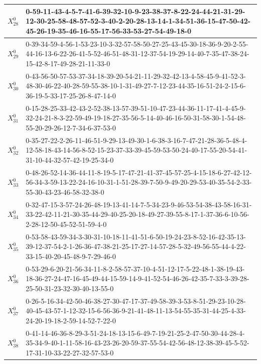 \begin{landscape}
{\begin{tabularx}{\linewidth}{|c|X|}
        $X_{28}^{0}$ & 0-59-11-43-4-5-7-41-6-39-32-10-9-23-38-37-8-22-24-44-21-31-29-12-30-25-58-48-57-52-3-40-2-20-28-13-14-1-34-51-36-15-47-50-42-45-26-19-35-46-16-55-17-56-33-53-27-54-49-18-0 \\ \hline
        $X_{29}^{0}$ & 0-39-34-59-4-56-1-53-23-10-3-32-57-58-50-27-25-43-45-30-18-36-9-20-2-55-44-16-13-6-22-26-41-5-52-46-51-48-31-12-37-54-19-29-14-40-7-35-47-38-24-15-42-8-17-49-28-21-11-33-0 \\ \hline
        $X_{30}^{0}$ & 0-43-56-50-57-53-37-34-18-39-20-54-21-11-29-32-42-13-4-58-45-9-41-52-3-48-30-46-22-40-28-59-55-38-10-1-31-49-27-7-12-23-44-35-16-51-24-2-15-6-36-19-5-33-17-25-26-8-47-14-0 \\ \hline
        $X_{31}^{0}$ & 0-15-28-25-33-42-43-2-52-38-13-57-39-51-10-47-23-44-36-11-17-41-4-45-9-32-24-21-8-3-22-59-49-19-18-27-35-56-5-14-40-46-16-50-31-58-30-1-54-48-55-20-29-26-12-7-34-6-37-53-0 \\ \hline
        $X_{32}^{0}$ & 0-35-27-22-2-26-11-46-51-9-29-13-49-30-1-6-38-3-16-7-47-21-28-36-5-48-4-12-58-18-43-14-56-8-52-15-23-37-33-39-45-59-53-50-24-40-17-55-20-54-41-31-10-44-32-57-42-19-25-34-0 \\ \hline
        $X_{33}^{0}$ & 0-48-26-52-14-36-44-11-8-19-5-17-47-21-41-37-45-57-25-4-15-18-6-27-42-12-56-34-3-59-13-22-24-16-10-31-1-51-28-39-7-50-9-49-20-29-53-40-35-54-2-33-55-30-43-23-46-58-32-38-0 \\ \hline
        $X_{34}^{0}$ & 0-32-47-15-3-57-24-26-48-19-13-41-14-7-5-34-23-9-46-53-54-38-43-58-16-31-33-22-42-11-21-30-35-44-29-40-25-20-18-49-27-39-55-8-17-1-37-36-6-10-56-2-28-12-50-45-52-51-59-4-0 \\ \hline
        $X_{35}^{0}$ & 0-53-58-43-59-34-3-30-31-10-18-11-41-51-6-50-19-24-23-8-52-16-42-35-13-39-12-37-54-2-1-26-36-47-38-21-25-17-27-14-57-28-5-32-49-56-55-44-4-22-33-15-40-20-45-48-9-7-29-46-0 \\ \hline
        $X_{36}^{0}$ & 0-53-29-6-20-21-56-34-11-8-2-58-57-37-10-4-51-12-17-5-22-48-1-38-19-43-18-36-27-24-47-16-45-49-44-15-59-14-9-41-52-54-46-26-42-35-7-33-3-39-28-25-50-31-23-32-30-40-13-55-0 \\ \hline
        $X_{37}^{0}$ & 0-26-5-16-34-42-50-46-38-27-30-47-17-37-49-58-39-3-53-8-51-29-23-10-28-40-45-43-57-1-12-32-15-6-56-36-9-21-41-48-11-13-54-55-35-31-44-25-4-33-24-20-19-18-2-59-14-52-7-22-0 \\ \hline
        $X_{38}^{0}$ & 0-41-14-46-36-8-29-3-51-24-18-13-15-6-49-7-19-21-25-2-47-50-30-44-28-4-35-34-9-40-1-11-58-16-43-23-26-20-59-37-55-54-42-56-48-12-38-39-45-5-52-17-31-10-33-22-27-32-57-53-0 \\ \hline

\end{tabularx}}
\end{landscape}
